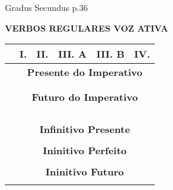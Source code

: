 \documentclass[12pt, oneside, a4paper, article]{article}
\begin{document}
\clearpage
Gradus Secundus p.36

\begin{table}[!hb]
\centering
\textbf{VERBOS REGULARES VOZ ATIVA} 
\vspace{1 ex}

\begin{tabular}{|l|p{2.5cm}|p{2.5cm}|p{2.5cm}|p{2.5cm}|p{2.5cm}|} 
\hline \hline
& \multicolumn{1}{c|}{I.} & \multicolumn{1}{c|}{II.} & \multicolumn{1}{c|}{III. A} & \multicolumn{1}{c|}{III. B} & \multicolumn{1}{c|}{IV.}  \\
\hline

& \multicolumn{5}{c|}{\textbf{Presente do Imperativo}} \\
\hline
 &  &  &  &  &    \\ \hline
 &  &  &  &  &   \\ 
\hline \hline

& \multicolumn{5}{c|}{\textbf{Futuro do Imperativo}} \\
\hline
 &  &  &  &  &   \\ \hline
 &  &  &  &  &   \\ \hline
 &  &  &  &  &   \\ \hline
 &  &  &  &  &   \\ 
\hline \hline

& \multicolumn{5}{c|}{\textbf{Infinitivo Presente}} \\
\hline
 &  &  &  &  &   \\ 
\hline \hline

& \multicolumn{5}{c|}{\textbf{Ininitivo Perfeito}} \\
\hline
 &  &  &  &  &   \\ 
\hline \hline

& \multicolumn{5}{c|}{\textbf{Ininitivo Futuro}} \\
\hline
 &  &  &  &  &   \\ 
\hline \hline

\end{tabular}
\end{table}

\end{document}
